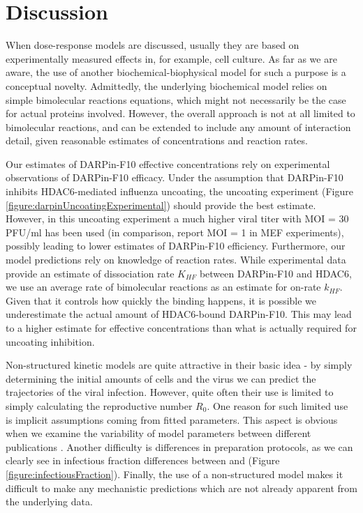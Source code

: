 \section{Discussion}

When dose-response models are discussed, usually they are based on experimentally measured effects in, for example, cell culture. As far as we are aware, the use of another biochemical-biophysical model for such a purpose is a conceptual novelty. Admittedly, the underlying biochemical model relies on simple bimolecular reactions equations, which might not necessarily be the case for actual proteins involved. However, the overall approach is not at all limited to bimolecular reactions, and can be extended to include any amount of interaction detail, given reasonable estimates of concentrations and reaction rates.

Our estimates of DARPin-F10 effective concentrations rely on experimental observations of DARPin-F10 efficacy. Under the assumption that DARPin-F10 inhibits HDAC6-mediated influenza uncoating, the uncoating experiment (Figure \ref{figure:darpinUncoatingExperimental}) should provide the best estimate. However, in this uncoating experiment a much higher viral titer with MOI = 30 PFU/ml has been used (in comparison, \cite{banerjee2014influenza} report MOI = 1 in MEF experiments), possibly leading to lower estimates of DARPin-F10 efficiency. Furthermore, our model predictions rely on knowledge of reaction rates. While experimental data provide an estimate of dissociation rate $K_{HF}$ between DARPin-F10 and HDAC6, we use an average rate of bimolecular reactions \cite{bionumbersbimolrate} as an estimate for on-rate $k_{HF}$. Given that it controls how quickly the binding happens, it is possible we underestimate the actual amount of HDAC6-bound DARPin-F10. This may lead to a higher estimate for effective concentrations than what is actually required for uncoating inhibition.

Non-structured kinetic models are quite attractive in their basic idea - by simply determining the initial amounts of cells and the virus we can predict the trajectories of the viral infection. However, quite often their use is limited to simply calculating the reproductive number $R_0$. One reason for such limited use is implicit assumptions coming from fitted parameters. This aspect is obvious when we examine the variability of model parameters between different publications \cite{smith2011influenza}. Another difficulty is differences in preparation protocols, as we can clearly see in infectious fraction differences between \cite{rudiger2019multiscale} and \cite{schulze2009infection} (Figure \ref{figure:infectiousFraction}). Finally, the use of a  non-structured model makes it difficult to make any mechanistic predictions which are not already apparent from the underlying data.

